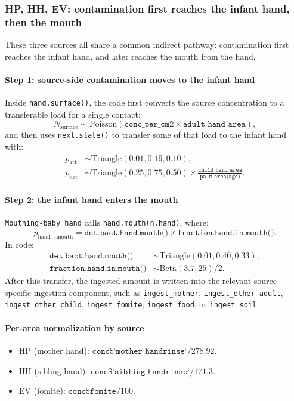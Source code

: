 \documentclass[11pt]{article}
\begin{document}
\subsubsection*{HP, HH, EV: contamination first reaches the infant hand, then the mouth}
These three sources all share a common indirect pathway: contamination first reaches the infant hand, and later reaches the mouth from the hand.

\paragraph{Step 1: source-side contamination moves to the infant hand}
Inside \texttt{hand.surface()}, the code first converts the source concentration to a transferable load for a single contact:
\[
N_{\text{surface}} \sim \mathrm{Poisson}(\texttt{conc\_per\_cm2} \times \texttt{adult hand area}),
\]
and then uses \texttt{next.state()} to transfer some of that load to the infant hand with:
\begin{align*}
p_{\text{att}} &\sim \mathrm{Triangle}(0.01, 0.19, 0.10),\\
p_{\text{det}} &\sim \mathrm{Triangle}(0.25, 0.75, 0.50) \times \frac{\texttt{child hand area}}{\texttt{palm area(age)}}.
\end{align*}

\paragraph{Step 2: the infant hand enters the mouth}
\texttt{Mouthing-baby hand} calls \texttt{hand.mouth(n.hand)}, where:
\[
p_{\text{hand}\to\text{mouth}}
=
\texttt{det.bact.hand.mouth()} \times \texttt{fraction.hand.in.mouth()}.
\]
In code:
\begin{align*}
\texttt{det.bact.hand.mouth()} &\sim \mathrm{Triangle}(0.01,0.40,0.33),\\
\texttt{fraction.hand.in.mouth()} &\sim \mathrm{Beta}(3.7,25)/2.
\end{align*}
After this transfer, the ingested amount is written into the relevant source-specific ingestion component, such as \texttt{ingest\_mother}, \texttt{ingest\_other adult}, \texttt{ingest\_other child}, \texttt{ingest\_fomite}, \texttt{ingest\_food}, or \texttt{ingest\_soil}.

\paragraph{Per-area normalization by source}
\begin{itemize}[leftmargin=2em]
  \item HP (mother hand): \(\texttt{conc\$`mother handrinse`} / 278.92\).
  \item HH (sibling hand): \(\texttt{conc\$`sibling handrinse`} / 171.3\).
  \item EV (fomite): \(\texttt{conc\$fomite} / 100\).
\end{itemize}
\end{document}

